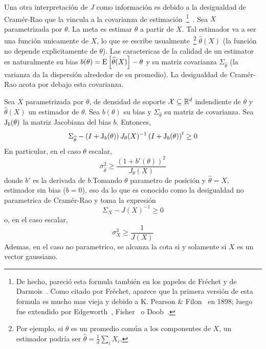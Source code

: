 Una otra interpretaci\'on  de $J$ como informaci\'on es  debido a la desigualdad
de  Cram\'er-Rao que  la vincula  a la  covarianza  de estimaci\'on~\footnote{De
  hecho,  pareci\'o esta  formula tambi\'en  en los  papeles de  Fr\'echet  y de
  Darmois~\cite{Fre43, Dar45}. Como citado por Fr\'echet, aparece que la primera
  versi\'on  de esta  formula  es mucho  mas vieja  y  debido a  K.  Pearson  \&
  Filon~\cite{PeaFil98} en 1898; luego fue extendido por Edgeworth~\cite{Edg08},
  Fisher~\cite{Fis25:07}  o  Doob~\cite{Doo36}.}~\cite{Rao45,  Rao92,  RaoWis47,
  Cra46,  Rio07, CovTho06,  Fri04,  Kay93, Bos07}.   Sea  $X$ parametrizada  por
$\theta$.  La meta es estimar $\theta$ a  partir de $X$.  Tal estimador va a ser
una  funci\'on unicamente  de $X$,  lo que  se  escribe usualmente~\footnote{Por
  ejemplo,  si $\theta$  es un  promedio com\'un  a los  componentes de  $X$, un
  estimador   podr\'ia   ser   $\widehat{\theta}   =   \frac1d   \sum_i   X_i$.}
$\widehat{\theta}(X)$ (la funci\'on no depende explicitamente de $\theta$).  Las
caractericas de la calidad de un  estimator es naturalmente su bias $b(\theta) =
\operatorname{E}\left[  \widehat{\theta}(X)  \right]  -   \theta$  y  su  matriz  covarianza
$\Sigma_{\widehat{\theta}}$  (la varianza  da  la dispersi\'on  alrededor de  su
promedio). La desigualdad de Cram\'er-Rao acota por debajo esta covarianza.
%
\begin{teorema}
  Sea  $X$ parametrizada  por $\theta$,  de  densidad de  soporte $\mathcal{X}  \subseteq
  \mathbb{R}^d$  indendiente  de $\theta$  y  $\widehat{\theta}(X)$  un estimador  de
  $\theta$.  Sea $b(\theta)$ su  bias y $\Sigma_{\widehat{\theta}}$ su matriz de
  covarianza.   Sea   $\operatorname{J}_b(\theta)$  la   matriz  Jacobiana  del   bias  $b$.
  Entonces,
  \[
  \Sigma_{\widehat{\theta}} - \left( I + \operatorname{J}_b(\theta) \right) J_\theta(X)^{-1}
  \left( I + \operatorname{J}_b(\theta) \right)^t \ge 0
  \]
  En particular, en el  caso $\theta$ escalar,
  \[
  \sigma_{\widehat{\theta}}^2 \ge \frac{(1+b'(\theta))^2}{J_\theta(X)}
  \]
  donde  $b'$ es  la  derivada  de $b$.\newline  Tomando  $\theta$ parametro  de
  posici\'on y $\widehat{\theta}  = X$, estimador sin bias ($b =  0$), eso da lo
  que es conocido  como la desigualdad no parametrica de  Cram\'er-Rao y toma la
  expresi\'on
  \[
  \Sigma_X - J(X)^{-1} \ge 0
  \]
  o, en el caso escalar,
  \[
  \sigma_X^2 \ge \frac{1}{J(X)}
  \]
  Ademas, en el caso no parametrico, se alcanza la cota si y solamente si $X$ es
  un vector gaussiano.
\end{teorema}
